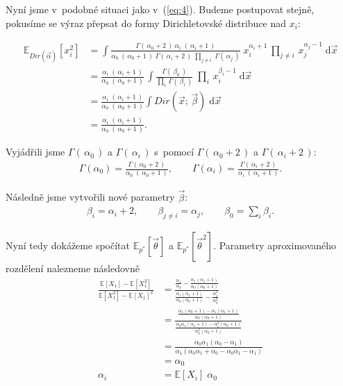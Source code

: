 Nyní jsme v~podobné situaci jako v~(\ref{eq:4}). Budeme postupovat stejně,
pokusíme se výraz přepsat do formy Dirichletovské distribuce nad $x_i$:

\begin{align}
\mathbb{E}_{Dir(\vec\alpha)}[x_i^2] &=
\int \frac{\Gamma(\,\alpha_0 + 2\,) \; \alpha_i \; (\,\alpha_i + 1\,)}
		{\alpha_0 \; (\,\alpha_0 + 1\,) \; \Gamma(\,\alpha_i + 2\,) \; \prod_{j \ne i} \; \Gamma(\,\alpha_j\,)} \;
    x_i^{\alpha_i + 1} \, \prod_{j \ne i} \, x_j^{\alpha_j - 1} \;
\mathrm{d}\vec x
\\
&= \frac{\alpha_i \; (\,\alpha_i + 1\,)}
		{\alpha_0 \; (\,\alpha_0 + 1\,)} \,
	\int \frac{\Gamma(\,\beta_0\,)}
		{\prod_i \,\Gamma(\,\beta_i\,)} \;
        \prod_i \, x_i^{\beta_i - 1} \;
    \mathrm{d}\vec x
\\
&= \frac{\alpha_i \; (\,\alpha_i + 1\,)}
		{\alpha_0 \; (\,\alpha_0 + 1\,)}
	\int Dir(\vec x;\, \vec\beta)\;
    \mathrm{d}\vec x
\\
&= \frac{\alpha_i \; (\,\alpha_i + 1\,)}
		{\alpha_0 \; (\,\alpha_0 + 1\,)}.
\end{align}

Vyjádřili jsme $\Gamma(\,\alpha_0\,)$ a $\Gamma(\,\alpha_i\,)$ s~pomocí $\Gamma(\,\alpha_0 + 2\,)$ a $\Gamma(\,\alpha_i + 2\,)$:
\begin{align}
\Gamma(\alpha_0) = \frac{\Gamma(\,\alpha_0 + 2\,)}
				{\alpha_0\;(\,\alpha_0 + 1\,)},
\quad \quad
\Gamma(\alpha_i) = \frac{\Gamma(\,\alpha_i + 2\,)}
				{\alpha_i \; (\,\alpha_i + 1\,)}.
\end{align}

Následně jsme vytvořili nové parametry $\vec\beta$:
\begin{align}
\beta_i = \alpha_i + 2, \quad \quad
\beta_{j \ne i} = \alpha_j, \quad \quad
\beta_0 = \sum_i \beta_i.
\end{align}

Nyní tedy dokážeme spočítat $\mathbb{E}_{p^*}[\vec\theta]$ a $\mathbb{E}_{p^*}[\vec\theta^2]$.
Parametry aproximovaného rozdělení nalezneme následovně
\begin{align}
\frac{\mathbb{E}[X_1] - \mathbb{E}[X_1^2]}
     {\mathbb{E}[X_1^2] - \mathbb{E}[X_1]^2} &=
\frac{
	\frac{\alpha_1}
		{\alpha_0}
	- \frac{\alpha_1(\alpha_1 + 1)}
		{\alpha_0(\alpha_0 + 1)}
	}
	{
	\frac{\alpha_1(\alpha_1 + 1)}
		{\alpha_0(\alpha_0 + 1)}
	- \frac{\alpha_1^2}
		{\alpha_0^2}
	}
\label{eq:5}
\\
&=
\frac{
    \frac{\alpha_1 (\alpha_0 + 1) - \alpha_1(\alpha_1 + 1)}
         {\alpha_0 (\alpha_0 + 1)}
}{
    \frac{\alpha_0 \alpha_1 (\alpha_1 + 1) - \alpha_1^2 (\alpha_0 + 1)}
         {\alpha_0^2 (\alpha_0 + 1)}
}
\\
&=
\frac{\alpha_0 \alpha_1 (\alpha_0 - \alpha_1)}
     {\alpha_1 (\alpha_0 \alpha_1 + \alpha_0 - \alpha_0 \alpha_1 - \alpha_1)}
\\
&=
\alpha_0
\\
\alpha_i &= \mathbb{E}[X_i] \;\alpha_0 \label{eq:6}
\end{align}

